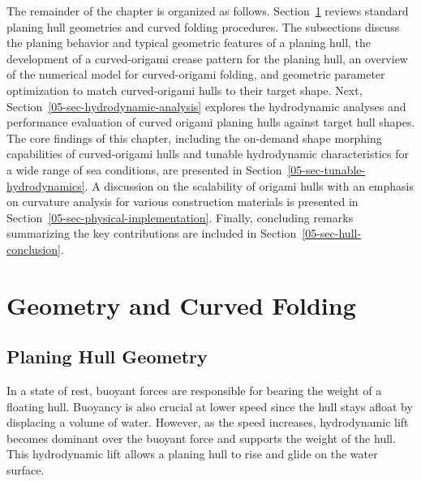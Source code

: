 The remainder of the chapter is organized as follows. Section~\ref{05-sec-geometry-curved-folding} reviews standard planing hull geometries and curved folding procedures. The subsections discuss the planing behavior and typical geometric features of a planing hull, the development of a curved-origami crease pattern for the planing hull, an overview of the numerical model for curved-origami folding, and geometric parameter optimization to match curved-origami hulls to their target shape. Next, Section~\ref{05-sec-hydrodynamic-analysis} explores the hydrodynamic analyses and performance evaluation of curved origami planing hulls against target hull shapes. The core findings of this chapter, including the on-demand shape morphing capabilities of curved-origami hulls and tunable hydrodynamic characteristics for a wide range of sea conditions, are presented in Section~\ref{05-sec-tunable-hydrodynamics}. A discussion on the scalability of origami hulls with an emphasis on curvature analysis for various construction materials is presented in Section~\ref{05-sec-physical-implementation}. Finally, concluding remarks summarizing the key contributions are included in Section~\ref{05-sec-hull-conclusion}.

\section{Geometry and Curved Folding}\label{05-sec-geometry-curved-folding}    

\subsection{Planing Hull Geometry}\label{05-subsec-planing-geometry}
In a state of rest, buoyant forces are responsible for bearing the weight of a floating hull. Buoyancy is also crucial at lower speed since the hull stays afloat by displacing a volume of water. However, as the speed increases, hydrodynamic lift becomes dominant over the buoyant force and supports the weight of the hull. This hydrodynamic lift allows a planing hull to rise and glide on the water surface.

